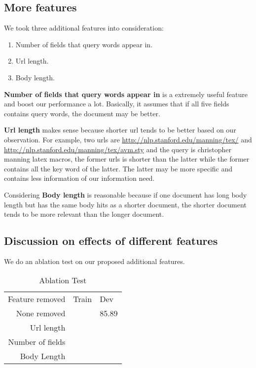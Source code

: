\documentclass{article}
\begin{document}
\subsection{More features}

We took three additional features into consideration:

\begin{enumerate}
    \item Number of fields that query words appear in.
    \item Url length.
    \item Body length.
\end{enumerate}

\textbf{Number of fields that query words appear in} is a extremely useful feature and boost our performance a lot. Basically, it assumes that if all five fields contains query words, the document may be better.

\textbf{Url length} makes sense because shorter url tends to be better based on our observation. For example, two urls are \url{http://nlp.stanford.edu/manning/tex/} and \url{http://nlp.stanford.edu/manning/tex/avm.sty} and the query is christopher manning latex macros, the former urls is shorter than the latter while the former contains all the key word of the latter. The latter may be more specific and contains less information of our information need.

Considering \textbf{Body length} is reasonable because if one document has long body length but has the same body hits as a shorter document, the shorter document tends to be more relevant than the longer document.

\subsection{Discussion on effects of different features}

We do an ablation test on our proposed additional features.

\begin{table}[!htb]
    \centering
    \begin{tabular}{| r | l | l |}
        \hline
        Feature removed & Train & Dev \\
        None removed & & 85.89 \\
        \hline
        Url length & & \\
        \hline
        Number of fields & & \\
        \hline
        Body Length & & \\
        \hline
    \end{tabular}
    \caption{Ablation Test}
    \label{table:ablation}
\end{table}
\end{document}
